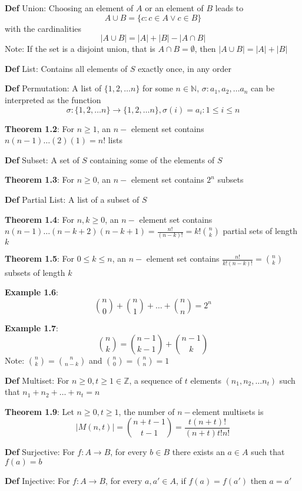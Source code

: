 \documentclass[11pt,notitlepage]{report}
\newcommand{\bb}[1]{\ensuremath{\mathbb{#1}}}
\begin{document}
\textbf{Def} Union: Choosing an element of $A$ or an element of $B$ leads to
$$A \cup B = \{c: c \in A \vee c \in B\}$$
with the cardinalities
$$|A \cup B| = |A| + |B| - |A \cap B|$$
\hspace*{5mm} Note: If the set is a disjoint union, that is $A \cap B = \emptyset$, then $|A \cup B| = |A| + |B|$

\textbf{Def} List: Contains all elements of $S$ exactly once, in any order

\textbf{Def} Permutation: A list of $\{1, 2, \dots n\}$ for some $n \in \bb N$, $\sigma : a_1, a_2, \dots a_n$ can be interpreted as the function
$$\sigma:\{1,2,\dots n\} \to \{1,2,\dots n\}, \sigma(i)= a_i : 1 \leq i \leq n$$

\textbf{Theorem 1.2}: For $n \geq 1$, an $n-$ element set contains $n(n-1)\dots (2)(1) = n!$ lists

\textbf{Def} Subset: A set of $S$ containing some of the elements of $S$

\textbf{Theorem 1.3}: For $n \geq 0$, an $n-$ element set contains $2^n$ subsets

\textbf{Def} Partial List: A list of a subset of $S$

\textbf{Theorem 1.4}: For $n, k \geq 0$, an $n-$ element set contains $n(n-1)\dots(n-k+2)(n-k+1) = \frac{n!}{(n-k)!} = k!\binom{n}{k}$ partial sets of length $k$

\textbf{Theorem 1.5}: For $0 \leq k \leq n$, an $n-$ element set contains $\frac{n!}{k!(n-k)!} = \binom{n}{k}$ subsets of length $k$

\textbf{Example 1.6}: $$\binom{n}{0} + \binom{n}{1} + \dots + \binom{n}{n} = 2^n$$

\newpage
\textbf{Example 1.7}: $$\binom{n}{k} = \binom{n-1}{k-1} + \binom{n-1}{k}$$
\hspace*{5mm} Note: $\binom{n}{k} = \binom{n}{n-k}$ and $\binom{n}{0} = \binom{n}{n} = 1$

\textbf{Def} Multiset: For $n \geq 0, t \geq 1 \in \bb Z$, a sequence of $t$ elements $(n_1, n_2, \dots n_t)$ such that $n_1 + n_2 + \dots + n_t = n$

\textbf{Theorem 1.9}: Let $n \geq 0, t \geq 1$, the number of $n-$element multisets is
$$|M(n, t)| = \binom{n+t-1}{t-1} = \frac{t(n+t)!}{(n+t)t!n!}$$

\textbf{Def} Surjective: For $f: A \to B$, for every $b \in B$ there exists an $a \in A$ such that $f(a) = b$

\textbf{Def} Injective: For $f: A \to B$, for every $a, a' \in A$, if $f(a) = f(a')$ then $a = a'$
\end{document}
